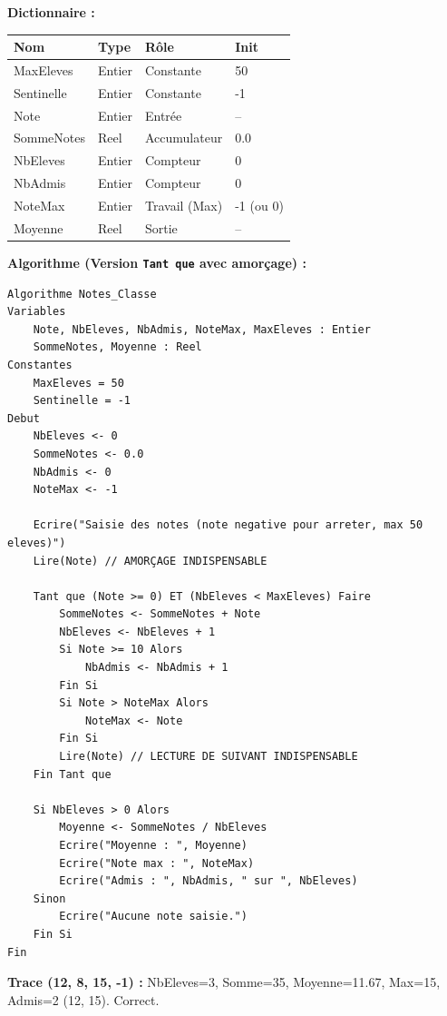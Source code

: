 \documentclass[11pt]{article}
\begin{document}
\begin{corrige}
\textbf{Dictionnaire :}
\begin{tabularx}{\linewidth}{|l|l|l|X|}\hline
\textbf{Nom} & \textbf{Type} & \textbf{Rôle} & \textbf{Init} \\\hline
MaxEleves & Entier & Constante & 50 \\\hline
Sentinelle & Entier & Constante & -1 \\\hline
Note & Entier & Entrée & -- \\\hline
SommeNotes & Reel & Accumulateur & 0.0 \\\hline
NbEleves & Entier & Compteur & 0 \\\hline
NbAdmis & Entier & Compteur & 0 \\\hline
NoteMax & Entier & Travail (Max) & -1 (ou 0) \\\hline
Moyenne & Reel & Sortie & -- \\\hline
\end{tabularx}

\textbf{Algorithme (Version \texttt{Tant que} avec amorçage) :}
\begin{lstlisting}
Algorithme Notes_Classe
Variables
    Note, NbEleves, NbAdmis, NoteMax, MaxEleves : Entier
    SommeNotes, Moyenne : Reel
Constantes
    MaxEleves = 50
    Sentinelle = -1
Debut
    NbEleves <- 0
    SommeNotes <- 0.0
    NbAdmis <- 0
    NoteMax <- -1

    Ecrire("Saisie des notes (note negative pour arreter, max 50 eleves)")
    Lire(Note) // AMORÇAGE INDISPENSABLE

    Tant que (Note >= 0) ET (NbEleves < MaxEleves) Faire
        SommeNotes <- SommeNotes + Note
        NbEleves <- NbEleves + 1
        Si Note >= 10 Alors
            NbAdmis <- NbAdmis + 1
        Fin Si
        Si Note > NoteMax Alors
            NoteMax <- Note
        Fin Si
        Lire(Note) // LECTURE DE SUIVANT INDISPENSABLE
    Fin Tant que

    Si NbEleves > 0 Alors
        Moyenne <- SommeNotes / NbEleves
        Ecrire("Moyenne : ", Moyenne)
        Ecrire("Note max : ", NoteMax)
        Ecrire("Admis : ", NbAdmis, " sur ", NbEleves)
    Sinon
        Ecrire("Aucune note saisie.")
    Fin Si
Fin
\end{lstlisting}
\textbf{Trace (12, 8, 15, -1) :} NbEleves=3, Somme=35, Moyenne=11.67, Max=15, Admis=2 (12, 15). Correct.
\end{corrige}
\end{document}

